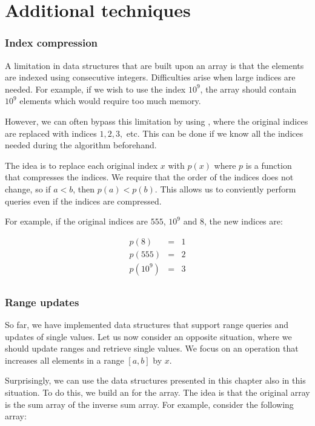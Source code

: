 \section{Additional techniques}

\subsubsection{Index compression}

A limitation in data structures that
are built upon an array is that
the elements are indexed using
consecutive integers.
Difficulties arise when large indices
are needed.
For example, if we wish to use the index $10^9$,
the array should contain $10^9$
elements which would require too much memory.


However, we can often bypass this limitation
by using ,
where the original indices are replaced
with indices $1,2,3,$ etc.
This can be done if we know all the indices
needed during the algorithm beforehand.

The idea is to replace each original index $x$
with $p(x)$ where $p$ is a function that
compresses the indices.
We require that the order of the indices
does not change, so if $a<b$, then $p(a)<p(b)$.
This allows us to conviently perform queries
even if the indices are compressed.

For example, if the original indices are
$555$, $10^9$ and $8$, the new indices are:

\[
\begin{array}{lcl}
p(8) & = & 1 \\
p(555) & = & 2 \\
p(10^9) & = & 3 \\
\end{array}
\]

\subsubsection{Range updates}

So far, we have implemented data structures
that support range queries and updates
of single values.
Let us now consider an opposite situation,
where we should update ranges and
retrieve single values.
We focus on an operation that increases all
elements in a range $[a,b]$ by $x$.

Surprisingly, we can use the data structures
presented in this chapter also in this situation.
To do this, we build an 
for the array.
The idea is that the original array is the sum array of the
inverse sum array.
For example, consider the following array:

